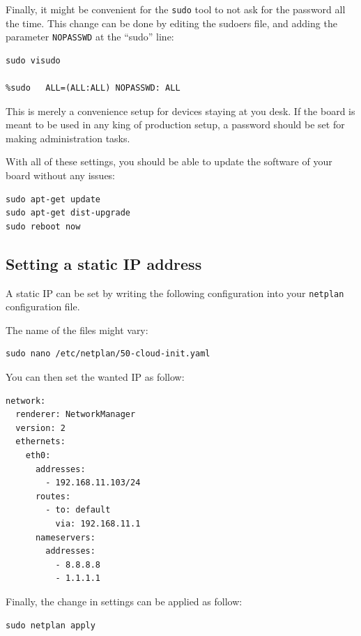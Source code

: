 \documentclass[10pt]{article}
\begin{document}
Finally, it might be convenient for the \verb|sudo| tool to not ask for the password all the time.
This change can be done by editing the sudoers file, and adding the parameter \verb|NOPASSWD|
at the ``sudo'' line:
\begin{tcolorbox}
\begin{verbatim}
sudo visudo

%sudo   ALL=(ALL:ALL) NOPASSWD: ALL
\end{verbatim}
\end{tcolorbox}

This is merely a convenience setup for devices staying at you desk. If
the board is meant to be used in any king of production setup, a password
should be set for making administration tasks.

With all of these settings, you should be able to update the software of your board
without any issues:
\begin{tcolorbox}
\begin{verbatim}
sudo apt-get update
sudo apt-get dist-upgrade
sudo reboot now
\end{verbatim}
\end{tcolorbox}


\subsection{Setting a static IP address}
\label{sec:setting-static-ip}
A static IP can be set by writing the following
configuration into your \verb|netplan| configuration file.

The name of the files might vary:
\begin{tcolorbox}
\begin{verbatim}
sudo nano /etc/netplan/50-cloud-init.yaml
\end{verbatim}
\end{tcolorbox}

You can then set the wanted IP as follow:
\begin{tcolorbox}
\begin{verbatim}
network:
  renderer: NetworkManager
  version: 2
  ethernets:
    eth0:
      addresses:
        - 192.168.11.103/24
      routes:
        - to: default
          via: 192.168.11.1
      nameservers:
        addresses:
          - 8.8.8.8
          - 1.1.1.1
\end{verbatim}
\end{tcolorbox}

Finally, the change in settings can be applied
as follow:
\begin{tcolorbox}
\begin{verbatim}
sudo netplan apply
\end{verbatim}
\end{tcolorbox}
\end{document}
